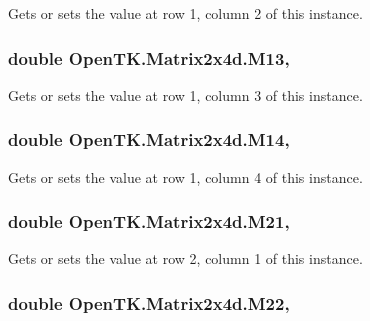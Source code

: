 Gets or sets the value at row 1, column 2 of this instance. 

\hypertarget{struct_open_t_k_1_1_matrix2x4d_af845de5431e5c09062113b273448fe92}{
\subsubsection[{M13}]{\setlength{\rightskip}{0pt plus 5cm}double Open\-T\-K.\-Matrix2x4d.\-M13\hspace{0.3cm}{\ttfamily [get]}, {\ttfamily [set]}}}\label{struct_open_t_k_1_1_matrix2x4d_af845de5431e5c09062113b273448fe92}


Gets or sets the value at row 1, column 3 of this instance. 

\hypertarget{struct_open_t_k_1_1_matrix2x4d_a2faa3e91dfd4ec4f58cb8d6941b12622}{
\subsubsection[{M14}]{\setlength{\rightskip}{0pt plus 5cm}double Open\-T\-K.\-Matrix2x4d.\-M14\hspace{0.3cm}{\ttfamily [get]}, {\ttfamily [set]}}}\label{struct_open_t_k_1_1_matrix2x4d_a2faa3e91dfd4ec4f58cb8d6941b12622}


Gets or sets the value at row 1, column 4 of this instance. 

\hypertarget{struct_open_t_k_1_1_matrix2x4d_aacd1ee880aa7955ef81828f7bf0948dc}{
\subsubsection[{M21}]{\setlength{\rightskip}{0pt plus 5cm}double Open\-T\-K.\-Matrix2x4d.\-M21\hspace{0.3cm}{\ttfamily [get]}, {\ttfamily [set]}}}\label{struct_open_t_k_1_1_matrix2x4d_aacd1ee880aa7955ef81828f7bf0948dc}


Gets or sets the value at row 2, column 1 of this instance. 

\hypertarget{struct_open_t_k_1_1_matrix2x4d_af2c85ac54d1d99635eff32e5e6d2322a}{
\subsubsection[{M22}]{\setlength{\rightskip}{0pt plus 5cm}double Open\-T\-K.\-Matrix2x4d.\-M22\hspace{0.3cm}{\ttfamily [get]}, {\ttfamily [set]}}}\label{struct_open_t_k_1_1_matrix2x4d_af2c85ac54d1d99635eff32e5e6d2322a}


